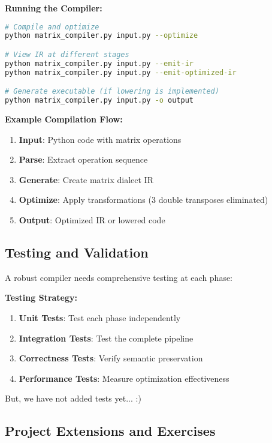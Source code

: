 \documentclass[11pt,a4paper]{article}
\begin{document}
\textbf{Running the Compiler:}
\begin{lstlisting}[language=bash, caption=Command-line usage]
# Compile and optimize
python matrix_compiler.py input.py --optimize

# View IR at different stages
python matrix_compiler.py input.py --emit-ir
python matrix_compiler.py input.py --emit-optimized-ir

# Generate executable (if lowering is implemented)
python matrix_compiler.py input.py -o output
\end{lstlisting}

\textbf{Example Compilation Flow:}
\begin{enumerate}
    \item \textbf{Input}: Python code with matrix operations
    \item \textbf{Parse}: Extract operation sequence
    \item \textbf{Generate}: Create matrix dialect IR
    \item \textbf{Optimize}: Apply transformations (3 double transposes eliminated)
    \item \textbf{Output}: Optimized IR or lowered code
\end{enumerate}
\subsection{Testing and Validation}

A robust compiler needs comprehensive testing at each phase:

\textbf{Testing Strategy:}
\begin{enumerate}
    \item \textbf{Unit Tests}: Test each phase independently
    \item \textbf{Integration Tests}: Test the complete pipeline
    \item \textbf{Correctness Tests}: Verify semantic preservation
    \item \textbf{Performance Tests}: Measure optimization effectiveness
\end{enumerate}

But, we have not added tests yet... :)

\subsection{Project Extensions and Exercises}
\end{document}
